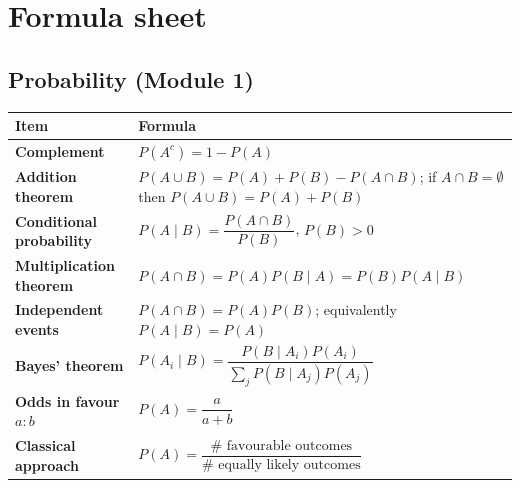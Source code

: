 \documentclass[11pt,a4paper]{article}
\begin{document}
\section{Formula sheet}

\subsection{Probability (Module 1)}
\begin{center}\small
\begin{tabularx}{\textwidth}{>{\bfseries}p{} X}
\toprule Item & Formula\\\midrule
Complement & $P(A^c)=1-P(A)$\\
Addition theorem & $P(A\cup B)=P(A)+P(B)-P(A\cap B)$; if $A\cap B=\emptyset$ then $P(A\cup B)=P(A)+P(B)$\\
Conditional probability & $P(A\mid B)=\dfrac{P(A\cap B)}{P(B)}$, $P(B)>0$\\
Multiplication theorem & $P(A\cap B)=P(A)P(B\mid A)=P(B)P(A\mid B)$\\
Independent events & $P(A\cap B)=P(A)P(B)$; equivalently $P(A\mid B)=P(A)$\\
Bayes' theorem & $P(A_i\mid B)=\dfrac{P(B\mid A_i)P(A_i)}{\sum_j P(B\mid A_j)P(A_j)}$\\
Odds in favour $a:b$ & $P(A)=\dfrac{a}{a+b}$\\
Classical approach & $P(A)=\dfrac{\#\text{ favourable outcomes}}{\#\text{ equally likely outcomes}}$\\\bottomrule
\end{tabularx}
\end{center}
\end{document}
